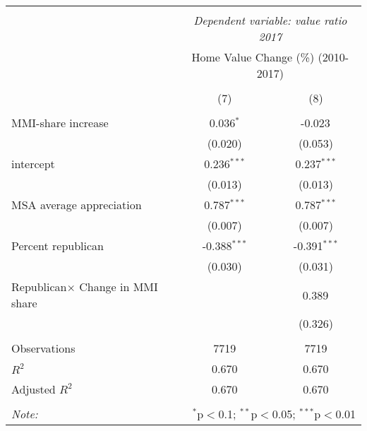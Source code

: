 \documentclass[11pt]{article}
\makeatletter
\newcommand{\boxspacing}{\kern\kvtcb@left@rule\kern\kvtcb@boxsep}
\newcommand{\prompt}[4]{
        {\ttfamily\llap{{\color{#2}[#3]:\hspace{3pt}#4}}\vspace{-\baselineskip}}
    }
\makeatother
\begin{document}
            \begin{tcolorbox}[breakable, size=fbox, boxrule=.5pt, pad at break*=1mm, opacityfill=0]
\prompt{Out}{outcolor}{40}{\boxspacing}
\end{tcolorbox}
\begin{table}[!htbp] \centering
    \begin{tabular}{@{\extracolsep{5pt}}lcc}
    \\[-1.8ex]\hline
    \hline \\[-1.8ex]
    & \multicolumn{2}{c}{\textit{Dependent variable: value ratio 2017}} \
    \cr \cline{2-3}
    \\[-1.8ex] & \multicolumn{2}{c}{Home Value Change (\%) (2010-2017)}  \\
    \\[-1.8ex] & (7) & (8) \\
    \hline \\[-1.8ex]
    MMI-share increase & 0.036$^{*}$ & -0.023$^{}$ \\
    & (0.020) & (0.053) \\
     intercept & 0.236$^{***}$ & 0.237$^{***}$ \\
    & (0.013) & (0.013) \\
     MSA average appreciation & 0.787$^{***}$ & 0.787$^{***}$ \\
    & (0.007) & (0.007) \\
     Percent republican & -0.388$^{***}$ & -0.391$^{***}$ \\
    & (0.030) & (0.031) \\
     Republican$\times$ Change in MMI share & & 0.389$^{}$ \\
    & & (0.326) \\
    \hline \\[-1.8ex]
     Observations & 7719 & 7719 \\
     $R^2$ & 0.670 & 0.670 \\
     Adjusted $R^2$ & 0.670 & 0.670 \\
    \\[-1.8ex]
    \hline\hline 
    \textit{Note:} & \multicolumn{2}{r}{$^{*}$p$<$0.1; $^{**}$p$<$0.05; $^{***}$p$<$0.01} \\
    \end{tabular}
    \end{table}
    
\end{document}
